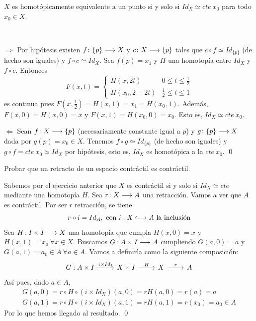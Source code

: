 \documentclass[GTS.tex]{subfiles}
\begin{document}
\begin{ejer} $X$ es homotópicamente equivalente a un punto si y solo si $Id_X\simeq cte\ x_0$ para todo $x_0\in X$.
\end{ejer}
\begin{solucion}\ 

$\boxed{\Rightarrow}$ Por hipótesis  existen $f\colon{\{p\}}\longrightarrow{X}$ y $c\colon{X}\longrightarrow{\{p\}}$ tales que $c\circ f\simeq Id_{\{p\}}$ (de hecho son iguales) y $f\circ c\simeq Id_X$. Sea $f(p)=x_1$ y $H$ una homotopía entre $Id_X$ y $f\circ c$. Entonces
\[
F(x,t)=\begin{cases}
H(x,2t) & 0\leq t\leq\frac{1}{2}\\
H(x_0,2-2t) & \frac{1}{2}\leq t\leq 1
\end{cases}
\]
es continua pues $F(x,\frac{1}{2})=H(x,1)=x_1=H(x_0,1)$. Además, $F(x,0)=H(x,0)=x$ y $F(x,1)=H(x_0,0)=x_0$. Esto es, $Id_X\simeq cte\ x_0$.

$\boxed{\Leftarrow}$ Sean $f\colon{X}\longrightarrow{\{p\}}$ (necesariamente constante igual a $p$) y $g\colon{\{p\}}\longrightarrow{X}$ dada por $g(p)= x_0\in X$. Tenemos $f\circ g\simeq Id_{\{p\}}$ (de hecho son iguales) y $g\circ f=cte\ x_0\simeq Id_X$ por hipótesis, esto es, $Id_X$ es homotópica a la $cte\ x_0$. \qed
\end{solucion}

\begin{ejer}
Probar que un retracto de un espacio contráctil es contráctil.
\end{ejer}
\begin{solucion}
Sabemos por el ejercicio anterior que $X$ es contráctil si y solo si $Id_X\simeq cte$ mediante una homotopía $H$. Sea $r\colon{X}\longrightarrow{A}$ una retracción. Vamos a ver que $A$ es contráctil. Por ser $r$ retracción, se tiene
\[
r\circ i =Id_A,\ \text{con }i: X\longhookarrow A\text{ la inclusión}
\]
Sea $H\colon{I\times I}\longrightarrow{X}$ una homotopía que cumpla $H(x,0)=x$ y $H(x,1)=x_0\ \forall x\in X$. Buscamos $G\colon{A\times I}\longrightarrow{A}$ cumpliendo  $G(a,0)=a$ y $G(a,1)=a_0\in A\ \forall a\in A$. Vamos a definirla como la siguiente composición:
\[
\begin{tikzcd}
G: A\times I \arrow[r,"i\times Id_I"]& X\times I \arrow[r, "H"] &  X \arrow[r,"r"] & A 
\end{tikzcd}
\]
Así pues, dado $a\in A$,
\begin{gather*}
G(a,0)=r\circ H\circ (i\times Id_X)(a,0)=rH(a,0)=r(a)=a\\
G(a,1)=r\circ H\circ (i\times Id_X)(a,1)=rH(a,1)=r(x_0)=a_0\in A
\end{gather*}
Por lo que hemos llegado al resultado. \qed
\end{solucion}
\end{document}
